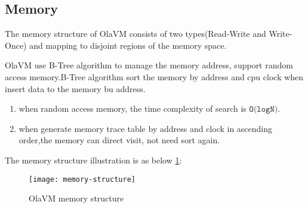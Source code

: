 \subsection{Memory}\label{subsec: ola-memory}
The memory structure of OlaVM consists of two types(Read-Write and Write-Once) and mapping to disjoint regions of the memory space.
\begin{table}[!ht]
    \caption{Instruction set}
    \label{table:instruction-set}
\end{table}


OlaVM use B-Tree algorithm to manage the memory address, support random access memory.B-Tree algorithm sort the memory by address and cpu clock when insert data to the memory bu address.
\begin{enumerate}
    \item when random access memory, the time complexity of search is $\texttt{O(logN)}$.
    \item when generate memory trace table by address and clock in ascending order,the memory can direct visit, not need sort again.
\end{enumerate}

The memory structure illustration is as below \ref{fig: B-tree-memory}:
\begin{figure}[!htp]
    \centering
    \texttt{[image: memory-structure]}
    \caption{OlaVM memory structure}
    \label{fig: B-tree-memory}
\end{figure}